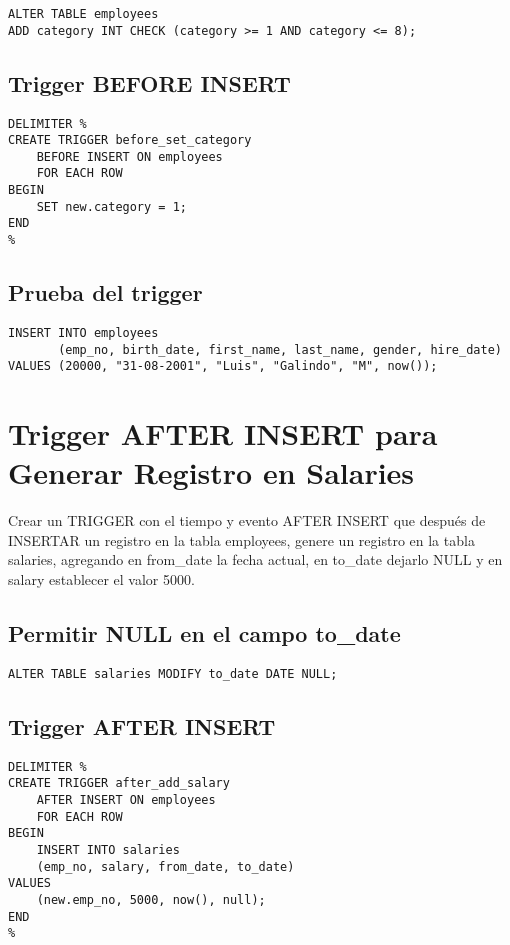 \documentclass[11pt]{article}
\begin{document}
\begin{verbatim}
ALTER TABLE employees   
ADD category INT CHECK (category >= 1 AND category <= 8);
\end{verbatim}

\subsection{Trigger BEFORE INSERT}
\label{sec:org3a4bb22}
\begin{verbatim}
DELIMITER %
CREATE TRIGGER before_set_category
    BEFORE INSERT ON employees
    FOR EACH ROW
BEGIN
    SET new.category = 1;
END
%
\end{verbatim}

\subsection{Prueba del trigger}
\label{sec:org68a8fcd}
\begin{verbatim}
INSERT INTO employees
       (emp_no, birth_date, first_name, last_name, gender, hire_date)
VALUES (20000, "31-08-2001", "Luis", "Galindo", "M", now());
\end{verbatim}

\section{Trigger AFTER INSERT para Generar Registro en Salaries}
\label{sec:orga44192e}
Crear un TRIGGER con el tiempo y evento AFTER INSERT que después de INSERTAR un
registro en la tabla employees, genere un registro en la tabla salaries, 
agregando en from\_date la fecha actual, en to\_date dejarlo NULL y en salary 
establecer el valor 5000.

\subsection{Permitir NULL en el campo to\_date}
\label{sec:orgc7bb4de}
\begin{verbatim}
ALTER TABLE salaries MODIFY to_date DATE NULL;  
\end{verbatim}

\subsection{Trigger AFTER INSERT}
\label{sec:orgfb652e0}
\begin{verbatim}
DELIMITER %
CREATE TRIGGER after_add_salary
    AFTER INSERT ON employees
    FOR EACH ROW
BEGIN
    INSERT INTO salaries
    (emp_no, salary, from_date, to_date)
VALUES
    (new.emp_no, 5000, now(), null);
END
%
\end{verbatim}
\end{document}
